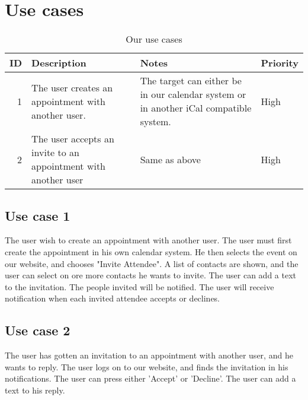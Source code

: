 \section{Use cases}
\begin{table*}[ht]\centering
  \begin{tabularx}{\textwidth}{@{}rXXl@{}}\toprule
    \textbf{ID} & \textbf{Description} & \textbf{Notes} & \textbf{Priority} \\\hline
    1 & The user creates an appointment with another user.             & The
    target can either be in our calendar system or in another iCal compatible
    system. & High \\\hline
    2 & The user accepts an invite to an appointment with another user & Same
    as above
    & High \\
    \bottomrule
  \end{tabularx}
  \caption{Our use cases}
  \label{usecases}\centering%
\end{table*}
\subsection{Use case 1}
The user wish to create an appointment with another user. The user must first create the appointment in his own calendar system. He then selects the event on our website, and chooses "Invite Attendee". A list of contacts are shown, and the user can select on ore more contacts he wants to invite. The user can add a text to the invitation. The people invited will be notified. The user will receive notification when each invited attendee accepts or declines.
\subsection{Use case 2}
The user has gotten an invitation to an appointment with another user, and he wants to reply.
The user logs on to our website, and finds the invitation in his notifications. The user can press either 'Accept' or 'Decline'. The user can add a text to his reply.
\newpage
